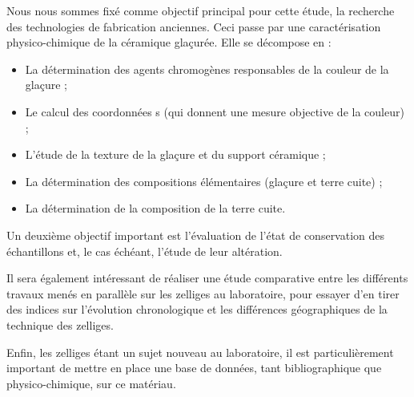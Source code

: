 Nous nous sommes fixé comme objectif principal pour cette étude, la 
recherche des technologies de fabrication anciennes. Ceci passe par 
une caractérisation physico-chimique de la céramique glaçurée. Elle 
se décompose en :

\begin{itemize}
\item La détermination des agents chromogènes responsables de la 
      couleur de la glaçure ;
\item Le calcul des coordonnées \trichro s (qui donnent une mesure objective de la couleur) ;
\item L'étude de la texture de la glaçure et du support céramique ;
\item La détermination des compositions élémentaires (glaçure et 
      terre cuite) ;
\item La détermination de la composition \cristallo de la terre cuite.
\end{itemize}

Un deuxième objectif important est l'évaluation de l'état de 
conservation des échantillons et, le cas échéant, l'étude de leur 
altération.

Il sera également intéressant de réaliser une étude comparative 
entre les différents travaux menés en parallèle sur les zelliges au 
laboratoire, pour essayer d'en tirer des indices sur l'évolution 
chronologique et les différences géographiques de la technique des 
zelliges.

Enfin, les zelliges étant un sujet nouveau au laboratoire, il est 
particulièrement important de mettre en place une base de données, 
tant bibliographique que physico-chimique, sur ce matériau.
